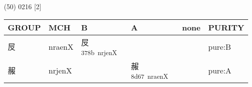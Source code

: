 \documentclass[14pt,a4paper]{scrartcl}
\begin{document}
(50) 0216 {[}2{]}

\begin{longtable}[c]{@{}llllll@{}}
\toprule
\begin{minipage}[b]{0.14\columnwidth}\raggedright\strut
GROUP
\strut\end{minipage} &
\begin{minipage}[b]{0.14\columnwidth}\raggedright\strut
MCH
\strut\end{minipage} &
\begin{minipage}[b]{0.14\columnwidth}\raggedright\strut
B
\strut\end{minipage} &
\begin{minipage}[b]{0.14\columnwidth}\raggedright\strut
A
\strut\end{minipage} &
\begin{minipage}[b]{0.14\columnwidth}\raggedright\strut
none
\strut\end{minipage} &
\begin{minipage}[b]{0.14\columnwidth}\raggedright\strut
PURITY
\strut\end{minipage}\tabularnewline
\midrule
\endhead
\begin{minipage}[t]{0.14\columnwidth}\raggedright\strut
㞋
\strut\end{minipage} &
\begin{minipage}[t]{0.14\columnwidth}\raggedright\strut
nraenX
\strut\end{minipage} &
\begin{minipage}[t]{0.14\columnwidth}\raggedright\strut
㞋\textsuperscript{378b~nrjenX}
\strut\end{minipage} &
\begin{minipage}[t]{0.14\columnwidth}\raggedright\strut
\strut\end{minipage} &
\begin{minipage}[t]{0.14\columnwidth}\raggedright\strut
\strut\end{minipage} &
\begin{minipage}[t]{0.14\columnwidth}\raggedright\strut
pure:B
\strut\end{minipage}\tabularnewline
\begin{minipage}[t]{0.14\columnwidth}\raggedright\strut
赧
\strut\end{minipage} &
\begin{minipage}[t]{0.14\columnwidth}\raggedright\strut
nrjenX
\strut\end{minipage} &
\begin{minipage}[t]{0.14\columnwidth}\raggedright\strut
\strut\end{minipage} &
\begin{minipage}[t]{0.14\columnwidth}\raggedright\strut
赧\textsuperscript{8d67~nraenX}
\strut\end{minipage} &
\begin{minipage}[t]{0.14\columnwidth}\raggedright\strut
\strut\end{minipage} &
\begin{minipage}[t]{0.14\columnwidth}\raggedright\strut
pure:A
\strut\end{minipage}\tabularnewline
\bottomrule
\end{longtable}
\end{document}
